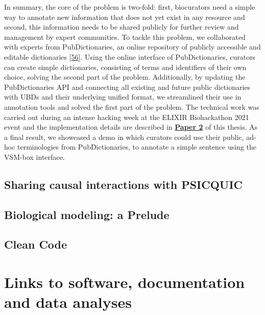 \documentclass[
  12pt,
]{book}
\begin{document}
In summary, the core of the problem is two-fold: first, biocurators need a simple way to annotate new information that does not yet exist in any resource and second, this information needs to be shared publicly for further review and management by expert communities.
To tackle this problem, we collaborated with experts from PubDictionaries, an online repository of publicly accessible and editable dictionaries {[}\protect\hyperlink{ref-Kim2019}{56}{]}.
Using the online interface of PubDictionaries, curators can create simple dictionaries, consisting of terms and identifiers of their own choice, solving the second part of the problem.
Additionally, by updating the PubDictionaries API and connecting all existing and future public dictionaries with UBDs and their underlying unified format, we streamlined their use in annotation tools and solved the first part of the problem.
The technical work was carried out during an intense hacking week at the ELIXIR Biohackathon 2021 event and the implementation details are described in \textbf{\protect\hyperlink{Paper2}{Paper 2}} of this thesis.
As a final result, we showcased a demo in which curators could use their public, ad-hoc terminologies from PubDictionaries, to annotate a simple sentence using the VSM-box interface.

\newpage

\hypertarget{sharing-causal-interactions-with-psicquic}{%
\section*{Sharing causal interactions with PSICQUIC}\label{sharing-causal-interactions-with-psicquic}}

\hypertarget{biological-modeling-a-prelude}{%
\section*{Biological modeling: a Prelude}\label{biological-modeling-a-prelude}}

\hypertarget{clean-code}{%
\section*{Clean Code}\label{clean-code}}

\hypertarget{appendix-appendix}{%
\appendix}


\hypertarget{links-to-software-documentation-and-data-analyses}{%
\chapter*{Links to software, documentation and data analyses}\label{links-to-software-documentation-and-data-analyses}}
\end{document}
